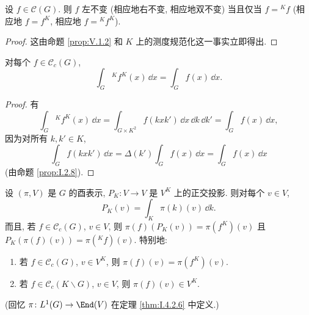 \begin{proposition}[不变性的刻画]
\label{prop:V.1.5}
设 $f \in \mathcal{C}(G)$. 则 $f$ 左不变 (相应地右不变, 相应地双不变) 当且仅当 $f = {}^Kf$ (相应地 $f = f^K$, 相应地 $f = {}^Kf^K$).
\end{proposition}

\begin{proof}
这由命题 \ref{prop:V.1.2} 和 $K$ 上的测度规范化这一事实立即得出.
\end{proof}

\begin{lemma}[双平均化的积分]
\label{lem:V.1.6}
对每个 $f \in \mathcal{C}_c(G)$,
\[
\int_G {}^Kf^K(x)\,\dd x = \int_G f(x)\,\dd x.
\]
\end{lemma}

\begin{proof}
有
\[
\int_G {}^Kf^K(x)\,\dd x = \int_{G \times K^2}f(kxk')\,\dd x\,\dd k\,\dd k' = \int_G f(x)\,\dd x,
\]
因为对所有 $k, k' \in K$,
\[
\int_G f(kxk')\,\dd x = \Delta(k')\int_G f(x)\,\dd x = \int_G f(x)\,\dd x
\]
(由命题 \ref{prop:I.2.8}).
\end{proof}

\begin{proposition}[投影算子]
\label{prop:V.1.7}
设 $(\pi, V)$ 是 $G$ 的酉表示, $P_K \colon V \to V$ 是 $V^K$ 上的正交投影. 则对每个 $v \in V$,
\[
P_K(v) = \int_K \pi(k)(v)\,\dd k.
\]
而且, 若 $f \in \mathcal{C}_c(G)$, $v \in V$, 则 $\pi(f)(P_K(v)) = \pi(f^K)(v)$ 且 $P_K(\pi(f)(v)) = \pi({}^Kf)(v)$. 特别地:
\begin{enumerate}
\item[(i)] 若 $f \in \mathcal{C}_c(G)$, $v \in V^K$, 则 $\pi(f)(v) = \pi(f^K)(v)$.
\item[(ii)] 若 $f \in \mathcal{C}_c(K\backslash G)$, $v \in V$, 则 $\pi(f)(v) \in V^K$.
\end{enumerate}
(回忆 $\pi \colon L^1(G) \to \End(V)$ 在定理 \ref{thm:I.4.2.6} 中定义.)
\end{proposition}

